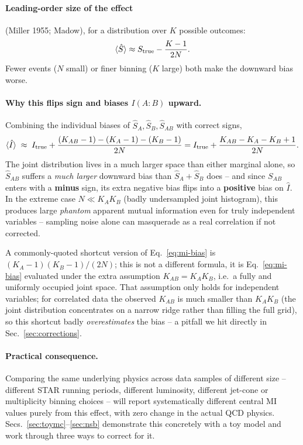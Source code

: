 \documentclass[11pt]{article}
\newcommand{\Strue}{S_{\rm true}}
\newcommand{\Itrue}{I_{\rm true}}
\begin{document}
\paragraph{Leading-order size of the effect} (Miller 1955; Madow), for a
distribution over $K$ possible outcomes:
\begin{equation}
\langle \hat S \rangle \approx \Strue - \frac{K-1}{2N}.
\end{equation}
Fewer events ($N$ small) or finer binning ($K$ large) both make the
downward bias worse.

\paragraph{Why this flips sign and biases $I(A{:}B)$ upward.} Combining
the individual biases of $\hat S_A,\hat S_B,\hat S_{AB}$ with correct
signs,
\begin{equation}
\langle\hat I\rangle \;\approx\; \Itrue +
\frac{(K_{AB}-1)-(K_A-1)-(K_B-1)}{2N}
= \Itrue + \frac{K_{AB}-K_A-K_B+1}{2N}.
\label{eq:mi-bias}
\end{equation}
The joint distribution lives in a much larger space than either marginal
alone, so $\hat S_{AB}$ suffers a \emph{much larger} downward bias than
$\hat S_A+\hat S_B$ does -- and since $S_{AB}$ enters with a
\textbf{minus} sign, its extra negative bias flips into a \textbf{positive}
bias on $\hat I$. In the extreme case $N \ll K_A K_B$ (badly undersampled
joint histogram), this produces large \emph{phantom} apparent mutual
information even for truly independent variables -- sampling noise alone
can masquerade as a real correlation if not corrected.

A commonly-quoted shortcut version of Eq.~\eqref{eq:mi-bias} is
$(K_A-1)(K_B-1)/(2N)$; this is not a different formula, it is
Eq.~\eqref{eq:mi-bias} evaluated under the extra assumption
$K_{AB}=K_AK_B$, i.e.\ a fully and uniformly occupied joint space. That
assumption only holds for independent variables; for correlated data the
observed $K_{AB}$ is much smaller than $K_AK_B$ (the joint distribution
concentrates on a narrow ridge rather than filling the full grid), so this
shortcut badly \emph{overestimates} the bias -- a pitfall we hit directly
in Sec.~\ref{sec:corrections}.

\paragraph{Practical consequence.} Comparing the same underlying physics
across data samples of different size -- different STAR running periods,
different luminosity, different jet-cone or multiplicity binning choices
-- will report systematically different central MI values purely from
this effect, with zero change in the actual QCD physics.
Secs.~\ref{sec:toymc}--\ref{sec:nsb} demonstrate this concretely with a
toy model and work through three ways to correct for it.
\end{document}
